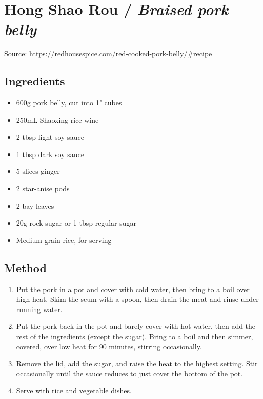 \clearpage
\section{Hong Shao Rou / \emph{Braised pork belly}}


Source: https://redhousespice.com/red-cooked-pork-belly/\#recipe

\subsection{Ingredients}

\begin{itemize}
    \item 600g pork belly, cut into 1" cubes
    \item 250mL Shaoxing rice wine
    \item 2 tbsp light soy sauce
    \item 1 tbsp dark soy sauce
    \item 5 slices ginger
    \item 2 star-anise pods
    \item 2 bay leaves
    \item 20g rock sugar or 1 tbsp regular sugar
    \item Medium-grain rice, for serving
\end{itemize}

\subsection{Method}

\begin{enumerate}
    \item Put the pork in a pot and cover with cold water, then bring to a boil over high heat. Skim the scum with a spoon, then drain the meat and rinse under running water.
    \item Put the pork back in the pot and barely cover with hot water, then add the rest of the ingredients (except the sugar). Bring to a boil and then simmer, covered, over low heat for 90 minutes, stirring occasionally.
    \item Remove the lid, add the sugar, and raise the heat to the highest setting. Stir occasionally until the sauce reduces to just cover the bottom of the pot.
    \item Serve with rice and vegetable dishes.
\end{enumerate}
